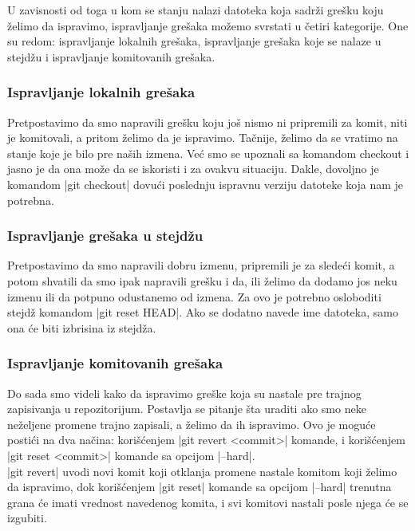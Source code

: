 \documentclass[a4paper]{article}
\begin{document}
{U zavisnosti od toga u kom se stanju nalazi datoteka koja sadrži grešku koju želimo da ispravimo, ispravljanje grešaka možemo svrstati u četiri kategorije. One su redom: ispravljanje lokalnih grešaka, ispravljanje grešaka koje se nalaze u stejdžu i ispravljanje komitovanih grešaka.

\subsubsection*{Ispravljanje lokalnih grešaka}
\label{lokalne_greske}
Pretpostavimo da smo napravili grešku koju još nismo ni pripremili za komit, niti je komitovali, a pritom želimo da je ispravimo. Tačnije, želimo da se vratimo na stanje koje je bilo pre naših izmena. Već smo se upoznali sa komandom checkout i jasno je da ona može da se iskoristi i za ovakvu situaciju. Dakle, dovoljno je komandom |git checkout| dovući poslednju ispravnu verziju datoteke koja nam je potrebna.

\subsubsection*{Ispravljanje grešaka u stejdžu}
\label{staging_greske}

Pretpostavimo da smo napravili dobru izmenu, pripremili je za sledeći komit, a potom shvatili da smo ipak napravili grešku i da, ili želimo da dodamo jos neku izmenu ili da potpuno odustanemo od izmena. Za ovo je potrebno osloboditi stejdž komandom |git reset HEAD|. Ako se dodatno navede ime datoteka, samo ona će biti izbrisina iz stejdža.

\subsubsection*{Ispravljanje komitovanih grešaka}
\label{komitovane_greske}
Do sada smo videli kako da ispravimo greške koja su nastale pre trajnog zapisivanja u repozitorijum. Postavlja se pitanje šta uraditi ako smo neke neželjene promene trajno zapisali, a želimo da ih ispravimo. Ovo je moguće postići na dva načina: korišćenjem |git revert <commit>| komande, i korišćenjem |git reset <commit>| komande sa opcijom |--hard|.\\

|git revert| uvodi novi komit koji otklanja promene nastale komitom koji želimo da ispravimo, dok korišćenjem |git reset| komande sa opcijom |--hard| trenutna grana će imati vrednost navedenog komita, i svi komitovi nastali posle njega će se izgubiti. \\

}
\end{document}
